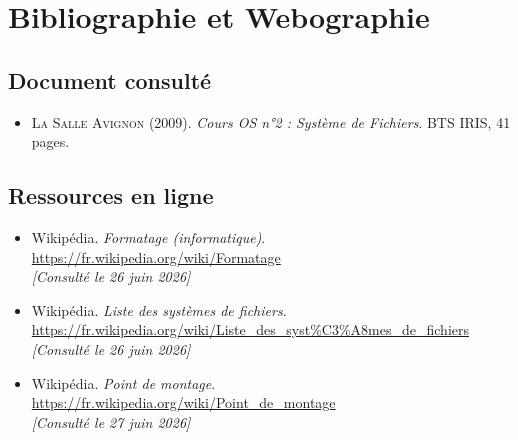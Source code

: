 \chapter*{Bibliographie et Webographie}

\section*{Document consulté}

\begin{itemize}[label=\textbullet]
    \item \textsc{La Salle Avignon} (2009). \textit{Cours OS n°2 : Système de Fichiers}. BTS IRIS, 41 pages.
\end{itemize}

\section*{Ressources en ligne}

\begin{itemize}[label=\textbullet]

    \item Wikipédia. \textit{Formatage (informatique)}. \\
    \url{https://fr.wikipedia.org/wiki/Formatage} \\
    \textit{[Consulté le 26 juin 2026]}

    \item Wikipédia. \textit{Liste des systèmes de fichiers}. \\
    \url{https://fr.wikipedia.org/wiki/Liste_des_syst\%C3\%A8mes_de_fichiers} \\
    \textit{[Consulté le 26 juin 2026]}

    \item Wikipédia. \textit{Point de montage}. \\
    \url{https://fr.wikipedia.org/wiki/Point_de_montage} \\
    \textit{[Consulté le 27 juin 2026]}

\end{itemize}